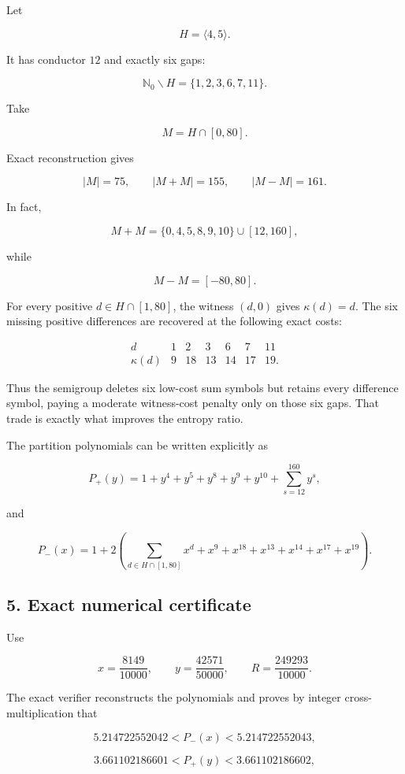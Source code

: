 \documentclass[
  10pt,
]{article}
\begin{document}
Let

\[
H=\langle4,5\rangle.
\]

It has conductor \(12\) and exactly six gaps:

\[
\mathbb N_0\mathbin{\backslash} H=\{1,2,3,6,7,11\}.
\]

Take

\[
M=H\cap[0,80].
\]

Exact reconstruction gives

\[
|M|=75,
\qquad
|M+M|=155,
\qquad
|M-M|=161.
\]

In fact,

\[
M+M=\{0,4,5,8,9,10\}\cup[12,160],
\]

while

\[
M-M=[-80,80].
\]

For every positive \(d\in H\cap[1,80]\), the witness \((d,0)\) gives
\(\kappa(d)=d\). The six missing positive differences are recovered at
the following exact costs:

\[
\begin{array}{c|rrrrrr}
d&1&2&3&6&7&11\\ \hline
\kappa(d)&9&18&13&14&17&19.
\end{array}
\]

Thus the semigroup deletes six low-cost sum symbols but retains every
difference symbol, paying a moderate witness-cost penalty only on those
six gaps. That trade is exactly what improves the entropy ratio.

The partition polynomials can be written explicitly as

\[
P_+(y)=1+y^4+y^5+y^8+y^9+y^{10}+\sum_{s=12}^{160}y^s,
\]

and

\[
P_-(x)=1+2\left(
\sum_{d\in H\cap[1,80]}x^d
+x^9+x^{18}+x^{13}+x^{14}+x^{17}+x^{19}
\right).
\]

\subsection{5. Exact numerical
certificate}\label{exact-numerical-certificate}

Use

\[
x=\frac{8149}{10000},
\qquad
y=\frac{42571}{50000},
\qquad
R=\frac{249293}{10000}.
\]

The exact verifier reconstructs the polynomials and proves by integer
cross-multiplication that

\[
5.214722552042<P_-(x)<5.214722552043,
\]

\[
3.661102186601<P_+(y)<3.661102186602,
\]
\end{document}
